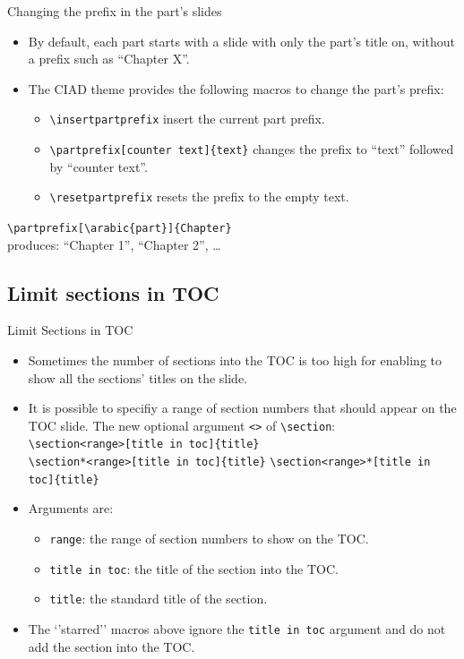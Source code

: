 \documentclass[english,sectioncirclenumberstyle]{ciadbeamer}
\begin{document}
\begin{frame}{{Changing the prefix} in the part's slides}
	\begin{itemize}
	\item By default, each part starts with a slide with only the part's title on, without a prefix such as ``Chapter X''.
	\vfill
	\item The CIAD theme provides the following macros to change the part's prefix:
		\begin{itemize}
		\item \texttt{{\textbackslash}insertpartprefix} insert the current part prefix.
		\item \texttt{{\textbackslash}partprefix[counter text]\{text\}} changes the prefix to ``text'' followed by ``counter text''.
		\item \texttt{{\textbackslash}resetpartprefix} resets the prefix to the empty text.
		\end{itemize}
	\end{itemize}
	\vfill
	\begin{example}
		\texttt{{\textbackslash}partprefix[{\textbackslash}arabic\{part\}]\{Chapter\}} \\
		produces: ``Chapter 1'', ``Chapter 2'', \dots
	\end{example}
\end{frame}

\subsection{Limit sections in TOC}

\begin{frame}{{Limit Sections} in TOC}
	\begin{itemize}
	\item Sometimes the number of sections into the TOC is too high for enabling to show all the sections' titles on the slide.
	\item It is possible to specifiy a range of section numbers that should appear on the TOC slide. The new optional argument \texttt{<>} of \texttt{{\textbackslash}section}: \\
		\texttt{{\textbackslash}section<range>[title in toc]\{title\}} \\
		\texttt{{\textbackslash}section*<range>[title in toc]\{title\}}
		\texttt{{\textbackslash}section<range>*[title in toc]\{title\}}
	\vfill
	\item Arguments are: \begin{itemize}
		\item \texttt{range}: the range of section numbers to show on the TOC.
		\item \texttt{title in toc}: the title of the section into the TOC.
		\item \texttt{title}: the standard title of the section.
		\end{itemize}
	\item The `'starred'' macros above ignore the \texttt{title in toc} argument and do not add the section into the TOC.
	\end{itemize}
\end{frame}
\end{document}
